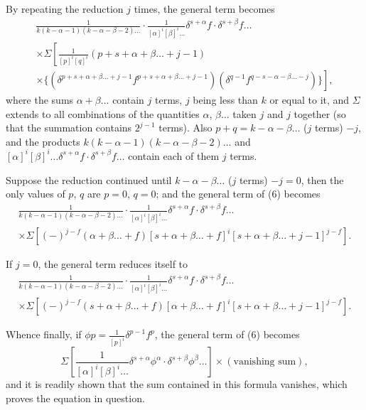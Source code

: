 \documentclass[11pt,a4paper]{article}
\theoremstyle{plain}
\begin{document}
By repeating the reduction $j$ times, the general term becomes
\begin{multline*}
\frac{1}{k(k-\alpha-1)(k-\alpha-\beta-2)\ldots} \cdot \frac{1}{[\alpha]^i [\beta]^i \ldots} \delta^{s+\alpha} f \cdot \delta^{s+\beta} f \ldots \\
\times \Sigma \left[ \frac{1}{[p]^i [q]^i} (p+s+\alpha+\beta\ldots+j-1) \right. \\
\left. \times \{ (\delta^{p+s+\alpha+\beta\ldots+j-1} f^{p+s+\alpha+\beta\ldots+j-1})(\delta^{q-1} f^{q-s-\alpha-\beta\ldots-j}) \} \right],
\end{multline*}
where the sums $\alpha + \beta \ldots$ contain $j$ terms, $j$ being less than $k$ or equal to it, and $\Sigma$ extends to all combinations of the quantities $\alpha$, $\beta \ldots$ taken $j$ and $j$ together (so that the summation contains $2^{j-1}$ terms). Also $p + q = k - \alpha - \beta \ldots$ ($j$ terms) $- j$, and the products $k(k-\alpha-1)(k-\alpha-\beta-2)\ldots$ and $[\alpha]^i [\beta]^i \ldots \delta^{s+\alpha} f \cdot \delta^{s+\beta} f \ldots$ contain each of them $j$ terms.

Suppose the reduction continued until $k - \alpha - \beta \ldots$ ($j$ terms) $- j = 0$, then the only values of $p$, $q$ are $p=0$, $q=0$; and the general term of (6) becomes
\begin{multline*}
\frac{1}{k(k-\alpha-1)(k-\alpha-\beta-2)\ldots} \cdot \frac{1}{[\alpha]^i [\beta]^i \ldots} \delta^{s+\alpha} f \cdot \delta^{s+\beta} f \ldots \\
\times \Sigma \left[ (-)^{j-f} (\alpha + \beta \ldots + f) [s + \alpha + \beta \ldots + f]^i [s + \alpha + \beta \ldots + j - 1]^{j-f} \right].
\end{multline*}

If $j=0$, the general term reduces itself to
\begin{multline*}
\frac{1}{k(k-\alpha-1)(k-\alpha-\beta-2)\ldots} \cdot \frac{1}{[\alpha]^i [\beta]^i \ldots} \delta^{s+\alpha} f \cdot \delta^{s+\beta} f \ldots \\
\times \Sigma \left[ (-)^{j-f} (s + \alpha + \beta \ldots + f) [\alpha + \beta \ldots + f]^i [s + \alpha + \beta \ldots + j - 1]^{j-f} \right].
\end{multline*}

Whence finally, if $\phi p = \frac{1}{[p]^i} \delta^{p-1} f^p$, the general term of (6) becomes
\[ \Sigma \left[ \frac{1}{[\alpha]^i [\beta]^i \ldots} \delta^{s+\alpha} \phi^{\alpha} \cdot \delta^{s+\beta} \phi^{\beta} \ldots \right] \times (\text{vanishing sum}), \]
and it is readily shown that the sum contained in this formula vanishes, which proves the equation in question.
\end{document}
